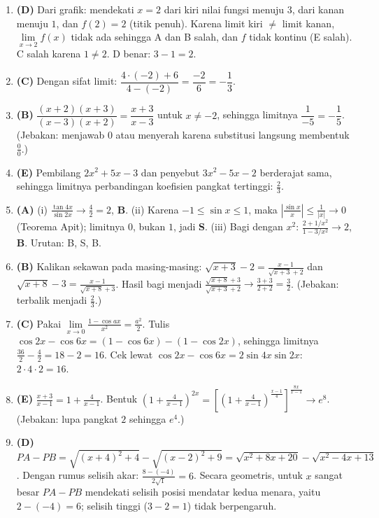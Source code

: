 \documentclass[a4paper,11pt]{article}
\begin{document}
\small\begin{enumerate}[leftmargin=2em,itemsep=2pt,topsep=2pt]
\item[\textbf{1.}] \textbf{(D)} Dari grafik: mendekati $x=2$ dari kiri nilai fungsi menuju $3$, dari kanan menuju $1$, dan $f(2)=2$ (titik penuh). Karena limit kiri $\ne$ limit kanan, $\lim\limits_{x\to2}f(x)$ tidak ada sehingga A dan B salah, dan $f$ tidak kontinu (E salah). C salah karena $1\ne2$. D benar: $3-1=2$.
\item[\textbf{2.}] \textbf{(C)} Dengan sifat limit: $\dfrac{4\cdot(-2)+6}{4-(-2)}=\dfrac{-2}{6}=-\dfrac13$.
\item[\textbf{3.}] \textbf{(B)} $\dfrac{(x+2)(x+3)}{(x-3)(x+2)}=\dfrac{x+3}{x-3}$ untuk $x\ne-2$, sehingga limitnya $\dfrac{1}{-5}=-\dfrac15$. (Jebakan: menjawab $0$ atau menyerah karena substitusi langsung membentuk $\frac00$.)
\item[\textbf{4.}] \textbf{(E)} Pembilang $2x^2+5x-3$ dan penyebut $3x^2-5x-2$ berderajat sama, sehingga limitnya perbandingan koefisien pangkat tertinggi: $\frac23$.
\item[\textbf{5.}] \textbf{(A)} (i) $\frac{\tan4x}{\sin2x}\to\frac42=2$, \textbf{B}. (ii) Karena $-1\le\sin x\le1$, maka $\left|\frac{\sin x}{x}\right|\le\frac1{|x|}\to0$ (Teorema Apit); limitnya $0$, bukan $1$, jadi \textbf{S}. (iii) Bagi dengan $x^2$: $\frac{2+1/x^2}{1-3/x^2}\to2$, \textbf{B}. Urutan: B, S, B.
\item[\textbf{6.}] \textbf{(B)} Kalikan sekawan pada masing-masing: $\sqrt{x+3}-2=\frac{x-1}{\sqrt{x+3}+2}$ dan $\sqrt{x+8}-3=\frac{x-1}{\sqrt{x+8}+3}$. Hasil bagi menjadi $\frac{\sqrt{x+8}+3}{\sqrt{x+3}+2}\to\frac{3+3}{2+2}=\frac32$. (Jebakan: terbalik menjadi $\frac23$.)
\item[\textbf{7.}] \textbf{(C)} Pakai $\lim\limits_{x\to0}\frac{1-\cos ax}{x^2}=\frac{a^2}2$. Tulis $\cos2x-\cos6x=(1-\cos6x)-(1-\cos2x)$, sehingga limitnya $\frac{36}2-\frac42=18-2=16$. Cek lewat $\cos2x-\cos6x=2\sin4x\sin2x$: $2\cdot4\cdot2=16$.
\item[\textbf{8.}] \textbf{(E)} $\frac{x+3}{x-1}=1+\frac4{x-1}$. Bentuk $\left(1+\frac4{x-1}\right)^{2x}=\left[\left(1+\frac4{x-1}\right)^{\frac{x-1}4}\right]^{\frac{8x}{x-1}}\to e^{8}$. (Jebakan: lupa pangkat $2$ sehingga $e^4$.)
\item[\textbf{9.}] \textbf{(D)} $PA-PB=\sqrt{(x+4)^2+4}-\sqrt{(x-2)^2+9}=\sqrt{x^2+8x+20}-\sqrt{x^2-4x+13}$. Dengan rumus selisih akar: $\frac{8-(-4)}{2\sqrt1}=6$. Secara geometris, untuk $x$ sangat besar $PA-PB$ mendekati selisih posisi mendatar kedua menara, yaitu $2-(-4)=6$; selisih tinggi ($3-2=1$) tidak berpengaruh.

\end{enumerate}
\end{document}
